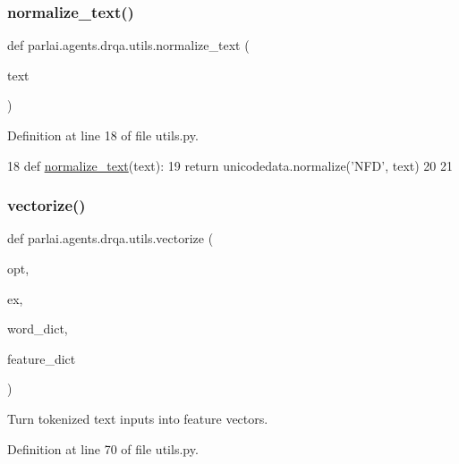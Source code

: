 \subsubsection{\texorpdfstring{normalize\+\_\+text()}{normalize\_text()}}
{\footnotesize\ttfamily def parlai.\+agents.\+drqa.\+utils.\+normalize\+\_\+text (\begin{DoxyParamCaption}\item[{}]{text }\end{DoxyParamCaption})}



Definition at line 18 of file utils.\+py.


\begin{DoxyCode}
18 \textcolor{keyword}{def }\hyperlink{namespaceparlai_1_1agents_1_1drqa_1_1utils_a125ab4e64306060e9ecaa3999f7be6b6}{normalize\_text}(text):
19     \textcolor{keywordflow}{return} unicodedata.normalize(\textcolor{stringliteral}{'NFD'}, text)
20 
21 
\end{DoxyCode}
\mbox{\label{namespaceparlai_1_1agents_1_1drqa_1_1utils_a5c76cc39e3014c7bcf9199d566dbdc0f}} 
\subsubsection{\texorpdfstring{vectorize()}{vectorize()}}
{\footnotesize\ttfamily def parlai.\+agents.\+drqa.\+utils.\+vectorize (\begin{DoxyParamCaption}\item[{}]{opt,  }\item[{}]{ex,  }\item[{}]{word\+\_\+dict,  }\item[{}]{feature\+\_\+dict }\end{DoxyParamCaption})}

\begin{DoxyVerb}Turn tokenized text inputs into feature vectors.
\end{DoxyVerb}
 

Definition at line 70 of file utils.\+py.


